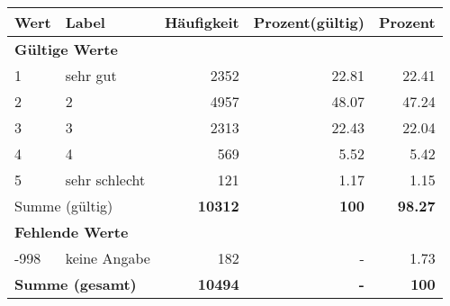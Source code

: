      \begin{longtable}{lXrrr}
     \toprule
     \textbf{Wert} & \textbf{Label} & \textbf{Häufigkeit} & \textbf{Prozent(gültig)} & \textbf{Prozent} \\
     \endhead
     \midrule
     \multicolumn{5}{l}{\textbf{Gültige Werte}}\\

     1 &
     \multicolumn{1}{X}{ sehr gut   } &


       \num{2352} &
       \num[round-mode=places,round-precision=2]{22,81} &
         \num[round-mode=places,round-precision=2]{22,41} \\

     2 &
     \multicolumn{1}{X}{ 2   } &


       \num{4957} &
       \num[round-mode=places,round-precision=2]{48,07} &
         \num[round-mode=places,round-precision=2]{47,24} \\

     3 &
     \multicolumn{1}{X}{ 3   } &


       \num{2313} &
       \num[round-mode=places,round-precision=2]{22,43} &
         \num[round-mode=places,round-precision=2]{22,04} \\

     4 &
     \multicolumn{1}{X}{ 4   } &


       \num{569} &
       \num[round-mode=places,round-precision=2]{5,52} &
         \num[round-mode=places,round-precision=2]{5,42} \\

     5 &
     \multicolumn{1}{X}{ sehr schlecht   } &


       \num{121} &
       \num[round-mode=places,round-precision=2]{1,17} &
         \num[round-mode=places,round-precision=2]{1,15} \\
     \midrule
     \multicolumn{2}{l}{Summe (gültig)} &
       \textbf{\num{10312}} &
     \textbf{100} &
       \textbf{\num[round-mode=places,round-precision=2]{98,27}} \\
     \multicolumn{5}{l}{\textbf{Fehlende Werte}}\\
       -998 &
       keine Angabe &
         \num{182} &
        - &
         \num[round-mode=places,round-precision=2]{1,73} \\
     \midrule
     \multicolumn{2}{l}{\textbf{Summe (gesamt)}} &
          \textbf{\num{10494}} &
        \textbf{-} &
        \textbf{100} \\
     \bottomrule
     \end{longtable}
     
